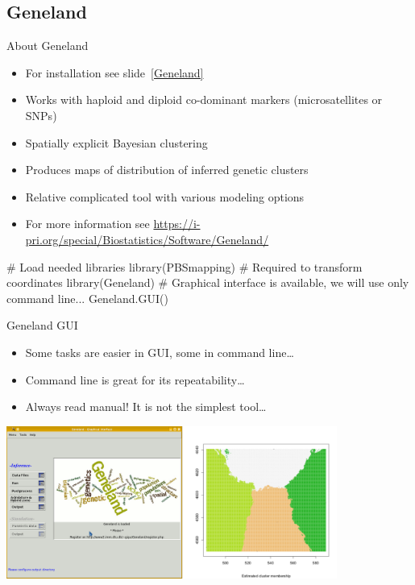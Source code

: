 \documentclass[compress, ucs, xelatex, 11pt, xcolor=svgnames, aspectratio=169,
	hyperref={
		bookmarks=true,
		unicode=true,
		colorlinks=true,
		pdftitle={Molecular data in R},
		plainpages=false,
		pdfauthor={Vojtech Zeisek},
		pdfsubject={Course about phylogeny and evolution in R},
		pdfcreator={XeLaTeX},
		pdfkeywords={R, evolution, phylogeny, molecular data},
		linkcolor=Crimson, %
		anchorcolor=Magenta, %
		citecolor=Magenta, %
		filecolor=Magenta, %
		menucolor=Magenta, %
		urlcolor=DodgerBlue, %
		pdftex},
	url={hyphens, lowtilde} %
	]{beamer}
\begin{document}
\subsection{Geneland}

\begin{frame}[fragile]{About Geneland}
	\label{GenelandUse}
	\begin{itemize}
		\item For installation see slide~\ref{Geneland}
		\item Works with haploid and diploid co-dominant markers (microsatellites or SNPs)
		\item Spatially explicit Bayesian clustering
		\item Produces maps of distribution of inferred genetic clusters
		\item Relative complicated tool with various modeling options
		\item For more information see \url{https://i-pri.org/special/Biostatistics/Software/Geneland/}
	\end{itemize}
	\vfill
	\begin{spluscode}
    # Load needed libraries
    library(PBSmapping) # Required to transform coordinates
    library(Geneland)
    # Graphical interface is available, we will use only command line...
    Geneland.GUI()
	\end{spluscode}
\end{frame}

\begin{frame}{Geneland GUI}
	\begin{itemize}
		\item Some tasks are easier in GUI, some in command line\ldots
		\item Command line is great for its repeatability\ldots
		\item Always read manual! It is not the simplest tool\ldots
	\end{itemize}
	\begin{center}
		\includegraphics[height=5cm]{geneland_gui.png}
	\end{center}
\end{frame}
\end{document}
